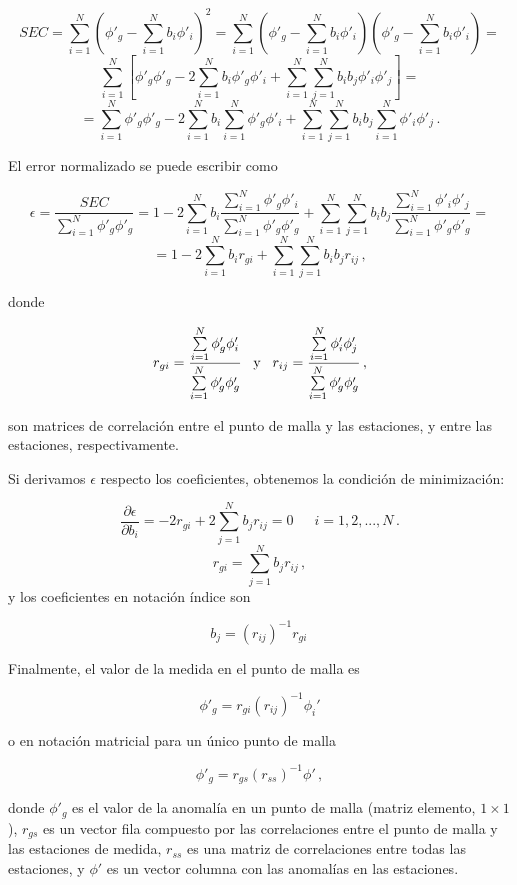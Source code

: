 \documentclass[
]{agujournal2019}
\begin{document}
\[SEC=\sum\limits^N_{i=1}\left(\phi'_g-\sum\limits_{i=1}^N b_i\phi'_i \right)^2
     =\sum\limits^N_{i=1}\left(\phi'_g-\sum\limits_{i=1}^N b_i\phi'_i \right)\left(\phi'_g-\sum\limits_{i=1}^N b_i\phi'_i \right)=\]
\[\sum\limits^N_{i=1}\left[\phi'_g \phi'_g -2\sum\limits_{i=1}^N b_i\phi'_g\phi'_i
      +\sum\limits^N_{i=1}\sum\limits^N_{j=1} b_i b_j \phi'_i \phi'_j \right]=\]
\[=\sum\limits^N_{i=1}\phi'_g \phi'_g -2 \sum\limits^N_{i=1} b_i \sum\limits^N_{i=1} \phi'_g\phi'_i + \sum\limits^N_{i=1}\sum\limits^N_{j=1}
b_i b_j \sum\limits^N_{i=1} \phi'_i \phi'_j\,.\]

El error normalizado se puede escribir como

\[\epsilon=\frac{SEC}{\sum\limits^N_{i=1}\phi'_g \phi'_g}=1-2 \sum\limits^N_{i=1} b_i \frac{\sum\limits^N_{i=1} \phi'_g\phi'_i}{\sum\limits^N_{i=1}\phi'_g \phi'_g} + \sum\limits^N_{i=1}\sum\limits^N_{j=1} b_i b_j \frac{\sum\limits^N_{i=1} \phi'_i \phi'_j}{\sum\limits^N_{i=1}\phi'_g \phi'_g}=\]
\[=1-2 \sum\limits^N_{i=1} b_i r_{gi} + \sum\limits^N_{i=1}\sum\limits^N_{j=1} b_i b_j r_{ij}\,,\]

donde

\[r_{gi}=\frac{\sum\limits^N_{i=1} \phi'_g\phi'_i}{\sum\limits^N_{i=1}\phi'_g \phi'_g}\,\,\,\,\,{\rm y}\,\,\,\,\,r_{ij}=\frac{\sum\limits^N_{i=1} \phi'_i \phi'_j}{\sum\limits^N_{i=1}\phi'_g \phi'_g}\,,\]

son matrices de correlación entre el punto de malla y las estaciones, y
entre las estaciones, respectivamente.

Si derivamos \(\epsilon\) respecto los coeficientes, obtenemos la
condición de minimización:

\[\frac{\partial{\epsilon}}{\partial{b_i}}=-2 r_{gi} + 2\sum\limits^N_{j=1}b_j r_{ij}=0\,\,\,\,\,\,\,\,\,i=1,2,...,N\,.\]
\[r_{gi}=\sum\limits^N_{j=1}b_j r_{ij}\,,\] y los coeficientes en
notación índice son

\[b_j=(r_{ij})^{-1}r_{gi}\,\]

Finalmente, el valor de la medida en el punto de malla es

\[\phi'_g=r_{gi}(r_{ij})^{-1}\phi_i'\]

o en notación matricial para un único punto de malla

\[\phi'_g=r_{gs}(r_{ss})^{-1}\phi'\,,\]

donde \(\phi'_g\) es el valor de la anomalía en un punto de malla
(matriz elemento, \(1\times 1\)), \(r_{gs}\) es un vector fila compuesto
por las correlaciones entre el punto de malla y las estaciones de
medida, \(r_{ss}\) es una matriz de correlaciones entre todas las
estaciones, y \(\phi'\) es un vector columna con las anomalías en las
estaciones.
\end{document}
